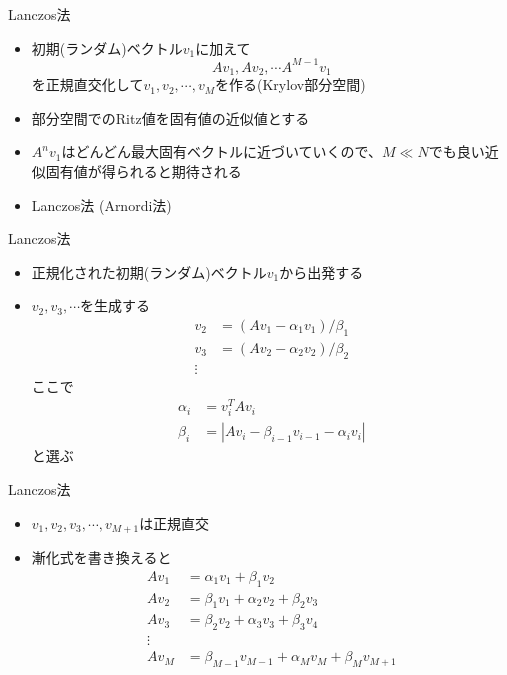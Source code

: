 \documentclass[dvipdfmx]{beamer}
\begin{document}
\begin{frame}[t,fragile]{Lanczos法}
  \begin{itemize}
    \setlength{\itemsep}{1em}
  \item 初期(ランダム)ベクトル$v_1$に加えて
    \[
    Av_1, Av_2, \cdots A^{M-1}v_1
    \]
    を正規直交化して$v_1,v_2,\cdots,v_M$を作る(Krylov部分空間)
  \item 部分空間でのRitz値を固有値の近似値とする
  \item $A^nv_1$はどんどん最大固有ベクトルに近づいていくので、$M \ll N$でも良い近似固有値が得られると期待される
  \item Lanczos法 (Arnordi法)
  \end{itemize}
\end{frame}

\begin{frame}[t,fragile]{Lanczos法}
  \begin{itemize}
  \item 正規化された初期(ランダム)ベクトル$v_1$から出発する %
  \item $v_2,v_3,\cdots$を生成する
    \begin{align*}
      v_2 &= (Av_1 - \alpha_1 v_1)/\beta_1 \\
      v_3 &= (Av_2 - \alpha_2 v_2)/\beta_2 \\
      \vdots
    \end{align*}
    ここで
    \begin{align*}
      \alpha_i &= v_i^T A v_i \\
      \beta_i &= | A v_i - \beta_{i-1} v_{i-1} - \alpha_i v_i |
    \end{align*}
    と選ぶ
  \end{itemize}
\end{frame}

\begin{frame}[t,fragile]{Lanczos法}
  \begin{itemize}
    \setlength{\itemsep}{1em}
  \item $v_1,v_2,v_3,\cdots,v_{M+1}$は正規直交
  \item 漸化式を書き換えると
    \begin{align*}
      Av_1 &= \alpha_1 v_1 + \beta_1 v_2 \\
      Av_2 &= \beta_1 v_1 + \alpha_2 v_2 + \beta_2 v_3 \\
      Av_3 &= \beta_2 v_2 + \alpha_3 v_3 + \beta_3 v_4 \\
      \vdots \\
      Av_{M} &= \beta_{M-1} v_{M-1} + \alpha_M v_M + \beta_M v_{M+1}
    \end{align*}
  \end{itemize}
\end{frame}
\end{document}
